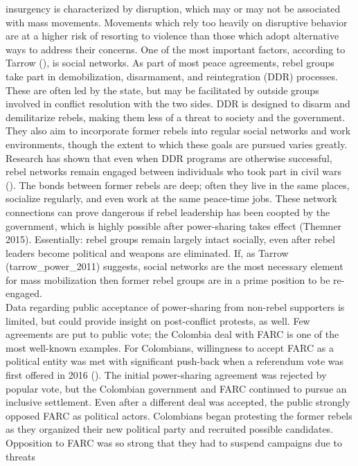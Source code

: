\documentclass[11pt,]{article}
\begin{document}
insurgency is characterized by disruption, which may or may not be
associated with mass movements. Movements which rely too heavily on
disruptive behavior are at a higher risk of resorting to violence than
those which adopt alternative ways to address their concerns. One of the
most important factors, according to Tarrow (\citet{tarrow_power_2011}),
is social networks. As part of most peace agreements, rebel groups take
part in demobilization, disarmament, and reintegration (DDR) processes.
These are often led by the state, but may be facilitated by outside
groups involved in conflict resolution with the two sides. DDR is
designed to disarm and demilitarize rebels, making them less of a threat
to society and the government. They also aim to incorporate former
rebels into regular social networks and work environments, though the
extent to which these goals are pursued varies greatly. Research has
shown that even when DDR programs are otherwise successful, rebel
networks remain engaged between individuals who took part in civil wars
(\citet{wiegink_former_2015}). The bonds between former rebels are deep;
often they live in the same places, socialize regularly, and even work
at the same peace-time jobs. These network connections can prove
dangerous if rebel leadership has been coopted by the government, which
is highly possible after power-sharing takes effect (Themner 2015).
Essentially: rebel groups remain largely intact socially, even after
rebel leaders become political and weapons are eliminated. If, as Tarrow
(tarrow\_power\_2011) suggests, social networks are the most necessary
element for mass mobilization then former rebel groups are in a prime
position to be re-engaged.\\
Data regarding public acceptance of power-sharing from non-rebel
supporters is limited, but could provide insight on post-conflict
protests, as well. Few agreements are put to public vote; the Colombia
deal with FARC is one of the most well-known examples. For Colombians,
willingness to accept FARC as a political entity was met with
significant push-back when a referendum vote was first offered in 2016
(\citet{katkov_colombias_2016}). The initial power-sharing agreement was
rejected by popular vote, but the Colombian government and FARC
continued to pursue an inclusive settlement. Even after a different deal
was accepted, the public strongly opposed FARC as political actors.
Colombians began protesting the former rebels as they organized their
new political party and recruited possible candidates. Opposition to
FARC was so strong that they had to suspend campaigns due to threats
\end{document}

